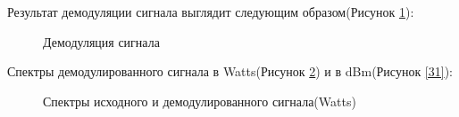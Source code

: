 \documentclass[a4paper,14pt]{extarticle}
\begin{document}
Результат демодуляции сигнала выглядит следующим образом(Рисунок \ref{29}):

\begin{figure}[H]
\caption{Демодуляция сигнала}
\label{29}
\end{figure}

Спектры демодулированного сигнала в Watts(Рисунок \ref{30}) и в dBm(Рисунок \ref{31}):

\begin{figure}[H]
\caption{Спектры исходного и демодулированного сигнала(Watts)}
\label{30}
\end{figure}
\end{document}
